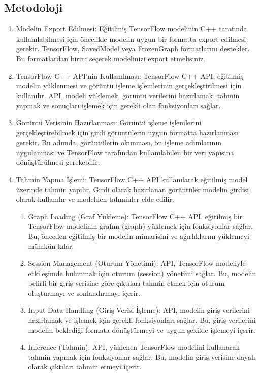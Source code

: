 \documentclass[12pt,a4paper]{article}
\begin{document}
	\begin{center}
	\pagebreak
		\section*{Metodoloji}
		\begin{enumerate}
			\item Modelin Export Edilmesi: Eğitilmiş TensorFlow modelinin C++ tarafında kullanılabilmesi için öncelikle modelin uygun bir formatta export edilmesi gerekir. TensorFlow, SavedModel veya FrozenGraph formatlarını destekler. Bu formatlardan birini seçerek modelinizi export etmelisiniz.
			\item TensorFlow C++ API'nin Kullanılması: TensorFlow C++ API, eğitilmiş modelin yüklenmesi ve görüntü işleme işlemlerinin gerçekleştirilmesi için kullanılır. API, modeli yüklemek, görüntü verilerini hazırlamak, tahmin yapmak ve sonuçları işlemek için gerekli olan fonksiyonları sağlar.
			\item 	Görüntü Verisinin Hazırlanması: Görüntü işleme işlemlerini gerçekleştirebilmek için girdi görüntülerin uygun formatta hazırlanması gerekir. Bu adımda, görüntülerin okunması, ön işleme adımlarının uygulanması ve TensorFlow tarafından kullanılabilen bir veri yapısına dönüştürülmesi gerekebilir.
			\item  Tahmin Yapma İşlemi: TensorFlow C++ API kullanılarak eğitilmiş model üzerinde tahmin yapılır. Girdi olarak hazırlanan görüntüler modelin girdisi olarak kullanılır ve modelden tahminler elde edilir.
			\begin{enumerate}
				\section*{TensorFlow C++ API Neleri İçerir}
				\item Graph Loading (Graf Yükleme): TensorFlow C++ API, eğitilmiş bir TensorFlow modelinin grafını (graph) yüklemek için fonksiyonlar sağlar. Bu, önceden eğitilmiş bir modelin mimarisini ve ağırlıklarını yüklemeyi mümkün kılar.
				\item Session Management (Oturum Yönetimi): API, TensorFlow modeliyle etkileşimde bulunmak için oturum (session) yönetimi sağlar. Bu, modelin belirli bir giriş verisine göre çıktıları tahmin etmek için oturum oluşturmayı ve sonlandırmayı içerir.
				\item Input Data Handling (Giriş Verisi İşleme): API, modelin giriş verilerini hazırlamak ve işlemek için gerekli fonksiyonları sağlar. Bu, giriş verilerini modelin beklediği formata dönüştürmeyi ve uygun şekilde işlemeyi içerir.
				\item Inference (Tahmin): API, yüklenen TensorFlow modelini kullanarak tahmin yapmak için fonksiyonlar sağlar. Bu, modelin giriş verisine dayalı olarak çıktıları tahmin etmeyi içerir.
				

\end{enumerate}
\end{enumerate}
\end{center}
\end{document}
